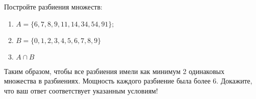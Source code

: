 \question
Постройте разбиения множеств:
\begin{enumerate}
	\renewcommand{\labelenumi}{\alph{enumi})}
	\item $A = \{6, 7, 8, 9, 11, 14, 34, 54, 91\};$
	\item $B = \{0, 1, 2, 3, 4, 5, 6, 7, 8, 9\}$
	\item $A \cap B$
\end{enumerate}
Таким образом, чтобы все разбиения имели как минимум 2 одинаковых множества в разбиениях.
Мощность каждого разбиение была более 6.
Докажите, что ваш ответ соответствует указанным условиям!
